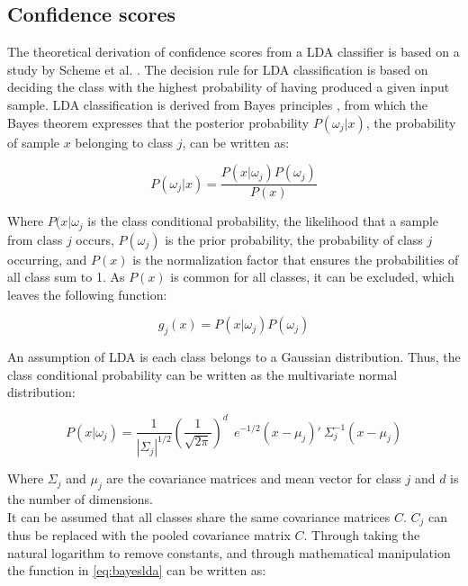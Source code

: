 \subsection{Confidence scores} \label{sub:P:confidencescores}
The theoretical derivation of confidence scores from a LDA classifier is based on a study by Scheme et al. \cite{Scheme2013}. The decision rule for LDA classification is based on deciding the class with the highest probability of having produced a given input sample. LDA classification is derived from Bayes principles \cite{Scheme2013a}, from which the Bayes theorem expresses that the posterior probability $P(\omega_{j}|x)$, the probability of sample $x$ belonging to class $j$, can be written as:

\begin{equation}
	P(\omega_{j}|x) = \frac{P(x|\omega_{j})P(\omega_{j})}{P(x)}
\end{equation}

Where $P(x|\omega_{j}$ is the class conditional probability, the likelihood that a sample from class $j$ occurs, $P(\omega_{j})$ is the prior probability, the probability of class $j$ occurring, and $P(x)$ is the normalization factor that ensures the probabilities of all class sum to 1. As $P(x)$ is common for all classes, it can be excluded, which leaves the following function:

\begin{equation} \label{eq:bayeslda}
	g_{j}(x) = P(x|\omega_{j})P(\omega_{j})
\end{equation} 

An assumption of LDA is each class belongs to a Gaussian distribution. Thus, the class conditional probability can be written as the multivariate normal distribution:
  
\begin{equation}
P(x|\omega_{j}) = \frac{1}{|\varSigma_{j}|^{1/2}}(\frac{1}{\sqrt{2\pi}})^{d} ~~e^{-1/2} (x-\mu_{j})' ~\varSigma^{-1}_{j} (x-\mu_{j})
\end{equation} 

Where $\varSigma_{j}$ and $\mu_{j}$ are the covariance matrices and mean vector for class $j$ and $d$ is the number of dimensions. \\
It can be assumed that all classes share the same covariance matrices $C$. $C_{j}$ can thus be replaced with the pooled covariance matrix $C$. Through taking the natural logarithm to remove constants, and through mathematical manipulation the function in \eqref{eq:bayeslda} can be written as:

